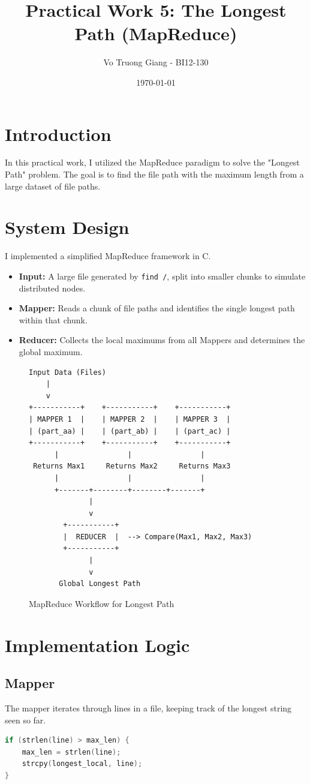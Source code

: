 \documentclass{article}
\title{Practical Work 5: The Longest Path (MapReduce)}
\author{Vo Truong Giang - BI12-130}
\date{\today}
\begin{document}
\maketitle

\section{Introduction}
In this practical work, I utilized the MapReduce paradigm to solve the "Longest Path" problem. The goal is to find the file path with the maximum length from a large dataset of file paths.

\section{System Design}
I implemented a simplified MapReduce framework in C.
\begin{itemize}
    \item \textbf{Input:} A large file generated by \texttt{find /}, split into smaller chunks to simulate distributed nodes.
    \item \textbf{Mapper:} Reads a chunk of file paths and identifies the single longest path within that chunk.
    \item \textbf{Reducer:} Collects the local maximums from all Mappers and determines the global maximum.
\end{itemize}

\begin{figure}[H]
\centering
\begin{verbatim}
Input Data (Files)
    |
    v
+-----------+    +-----------+    +-----------+
| MAPPER 1  |    | MAPPER 2  |    | MAPPER 3  |
| (part_aa) |    | (part_ab) |    | (part_ac) |
+-----------+    +-----------+    +-----------+
      |                |                |
 Returns Max1     Returns Max2     Returns Max3
      |                |                |
      +-------+--------+--------+-------+
              |
              v
        +-----------+
        |  REDUCER  |  --> Compare(Max1, Max2, Max3)
        +-----------+
              |
              v
       Global Longest Path
\end{verbatim}
\caption{MapReduce Workflow for Longest Path}
\end{figure}

\section{Implementation Logic}
\subsection{Mapper}
The mapper iterates through lines in a file, keeping track of the longest string seen so far.
\begin{lstlisting}[language=C, basicstyle=\small, frame=single]
if (strlen(line) > max_len) {
    max_len = strlen(line);
    strcpy(longest_local, line);
}
\end{lstlisting}
\end{document}
